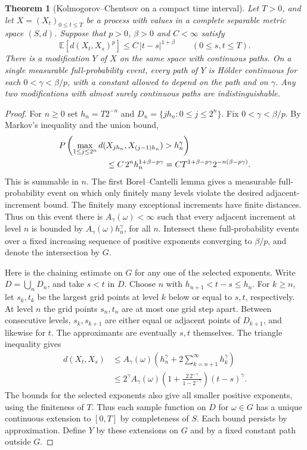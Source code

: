 \documentclass[11pt,oneside,openany]{book}
\newcommand{\E}{\mathbb{E}}
\theoremstyle{plain}
\newtheorem{theorem}{Theorem}[chapter]
\theoremstyle{definition}
\theoremstyle{remark}
\begin{document}
\begin{theorem}[Kolmogorov--Chentsov on a compact time interval]\label{thm:kolmogorov-chentsov}
Let \(T>0\), and let \(X=(X_t)_{0\le t\le T}\) be a process with values in a complete separable metric space \((S,d)\). Suppose that \(p>0\), \(\beta>0\) and \(C<\infty\) satisfy
\[
 \E[d(X_t,X_s)^p]\le C\,\lvert t-s\rvert^{1+\beta}
 \qquad(0\le s,t\le T).
\]
There is a modification \(Y\) of \(X\) on the same space with continuous paths. On a single measurable full-probability event, every path of \(Y\) is Hölder continuous for each \(0<\gamma<\beta/p\), with a constant allowed to depend on the path and on \(\gamma\). Any two modifications with almost surely continuous paths are indistinguishable.
\end{theorem}
\begin{proof}
For \(n\ge0\) set \(h_n=T2^{-n}\) and \(D_n=\{jh_n:0\le j\le2^n\}\). Fix \(0<\gamma<\beta/p\). By Markov's inequality and the union bound,
\begin{align*}
 &P\left(\max_{1\le j\le2^n}
       d(X_{jh_n},X_{(j-1)h_n})>h_n^\gamma\right)\\
 &\hspace{20mm}\le C\,2^n h_n^{1+\beta-p\gamma}
   = C T^{1+\beta-p\gamma}2^{-n(\beta-p\gamma)}.
\end{align*}
This is summable in \(n\). The first Borel--Cantelli lemma gives a measurable full-probability event on which only finitely many levels violate the desired adjacent-increment bound. The finitely many exceptional increments have finite distances. Thus on this event there is \(A_\gamma(\omega)<\infty\) such that every adjacent increment at level \(n\) is bounded by \(A_\gamma(\omega)h_n^\gamma\), for all \(n\). Intersect these full-probability events over a fixed increasing sequence of positive exponents converging to \(\beta/p\), and denote the intersection by \(G\).

Here is the chaining estimate on \(G\) for any one of the selected exponents. Write \(D=\bigcup_n D_n\), and take \(s<t\) in \(D\). Choose \(n\) with \(h_{n+1}<t-s\le h_n\). For \(k\ge n\), let \(s_k,t_k\) be the largest grid points at level \(k\) below or equal to \(s,t\), respectively. At level \(n\) the grid points \(s_n,t_n\) are at most one grid step apart. Between consecutive levels, \(s_k,s_{k+1}\) are either equal or adjacent points of \(D_{k+1}\), and likewise for \(t\). The approximants are eventually \(s,t\) themselves. The triangle inequality gives
\begin{align*}
 d(X_t,X_s)
 &\le A_\gamma(\omega)\left(h_n^\gamma+
         2\sum_{k=n+1}^{\infty}h_k^\gamma\right)\\
 &\le 2^\gamma A_\gamma(\omega)
        \left(1+\frac{2\,2^{-\gamma}}{1-2^{-\gamma}}\right)
            (t-s)^\gamma.
\end{align*}
The bounds for the selected exponents also give all smaller positive exponents, using the finiteness of \(T\). Thus each sample function on \(D\) for \(\omega\in G\) has a unique continuous extension to \([0,T]\) by completeness of \(S\). Each bound persists by approximation. Define \(Y\) by these extensions on \(G\) and by a fixed constant path outside \(G\).


\end{proof}
\end{document}
